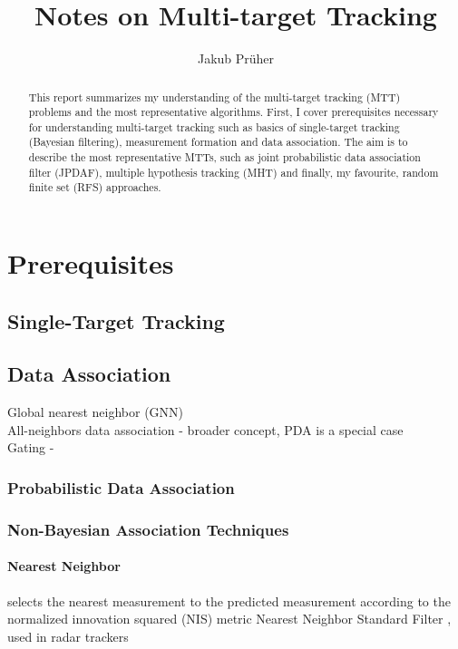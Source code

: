 \documentclass[a4paper]{scrreprt}
\title{Notes on Multi-target Tracking}
\author{Jakub Prüher}
\theoremstyle{theorem}
\theoremstyle{definition}
\begin{document}
\maketitle

\begin{abstract}
	This report summarizes my understanding of the multi-target tracking (MTT) problems and the most representative algorithms. 
	First, I cover prerequisites necessary for understanding multi-target tracking such as basics of single-target tracking (Bayesian filtering), measurement formation and data association.
	The aim is to describe the most representative MTTs, such as joint probabilistic data association filter (JPDAF), multiple hypothesis tracking (MHT) and finally, my favourite, random finite set (RFS) approaches.
\end{abstract}




\chapter{Prerequisites}\label{ch:prerequisites}


\section{Single-Target Tracking}\label{sec:single-target_tracking}




\section{Data Association}\label{sec:data_association}
Global nearest neighbor (GNN)\\
All-neighbors data association - broader concept, PDA is a special case\\
Gating - 

\subsection{Probabilistic Data Association}


\subsection{Non-Bayesian Association Techniques}

\subsubsection{Nearest Neighbor}
selects the nearest measurement to the predicted measurement according to the normalized innovation squared (NIS) metric
Nearest Neighbor Standard Filter \citep{Bar-Shalom1995}, used in radar trackers
\end{document}
